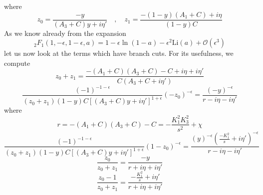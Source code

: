 where
\begin{equation*}
z_0 = \frac{-y}{(A_3 + C)y +i\eta'}\quad,\quad
z_1 = \frac{-(1-y)(A_1 + C)+i\eta}{(1-y)C}
\end{equation*}
As we know already from the expansion
\begin{equation*}
{}_2F_1(1,-\epsilon,1-\epsilon,a) = 1-\epsilon\ln(1-a) - \epsilon^2\mathrm{Li}(a) + \mathcal{O}(\epsilon^{3})
\end{equation*}
let us now look at the terms which have branch cuts. 
For its usefulness, we compute
\begin{equation*}
z_0 + z_1 = \frac{-(A_1 + C)(A_3 + C) - C +i\eta + i\eta'}{C(A_3 + C + i\eta')}
\end{equation*}
%
\begin{equation}
\frac{(-1)^{-1-\epsilon}}{(z_0+z_1)(1-y)C[(A_3 + C )y + i\eta']^{1+\epsilon}}(-z_0)^{-\epsilon}
= \frac{(-y)^{-\epsilon}}{r - i\eta-i\eta'}
\end{equation}
where
\begin{equation*}
r = -(A_1 + C)(A_3 + C)-C = -\frac{K^2_1K_3^2}{s^2} +\chi 
\end{equation*}
%
\begin{equation}
\frac{(-1)^{-1-\epsilon}}{(z_0+z_1)(1-y)C[(A_3 + C)y + i\eta']^{1+\epsilon}}(1-z_0)^{-\epsilon}
= \frac{(y)^{-\epsilon}(\frac{-K_1^2}{s}+i\eta')^{-\epsilon}}{r - i\eta-i\eta'}
\end{equation}
%
\begin{equation}
\frac{z_0}{z_0 + z_1} = \frac{-y}{r + i\eta + i\eta'}
\end{equation}
%
\begin{equation}
\frac{z_0 - 1}{z_0 + z_1} = \frac{-\frac{K_1^2}{s}+i\eta'}{r + i\eta + i\eta'}
\end{equation}










